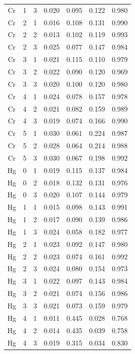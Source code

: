 \documentclass[ms, hidelinks]{uncgdissertationexp3}
\theoremstyle{plain}
\theoremstyle{definition}
\theoremstyle{remark}
\begin{document}
\begin{longtable}{ccccccc}
  Cr & 1 & 3 & 0.020 & 0.095 & 0.122 & 0.980\\
  \rowcolor{gray!6}  Cr & 2 & 1 & 0.016 & 0.108 & 0.131 & 0.990\\
  Cr & 2 & 2 & 0.013 & 0.102 & 0.119 & 0.993\\
  \rowcolor{gray!6}  Cr & 2 & 3 & 0.025 & 0.077 & 0.147 & 0.984\\
  Cr & 3 & 1 & 0.021 & 0.115 & 0.110 & 0.979\\
  \rowcolor{gray!6}  Cr & 3 & 2 & 0.022 & 0.090 & 0.120 & 0.969\\
  Cr & 3 & 3 & 0.020 & 0.100 & 0.120 & 0.980\\
  \rowcolor{gray!6}  Cr & 4 & 1 & 0.024 & 0.078 & 0.157 & 0.978\\
  Cr & 4 & 2 & 0.021 & 0.082 & 0.159 & 0.989\\
  \rowcolor{gray!6}  Cr & 4 & 3 & 0.019 & 0.074 & 0.166 & 0.990\\
  Cr & 5 & 1 & 0.030 & 0.061 & 0.224 & 0.987\\
  \rowcolor{gray!6}  Cr & 5 & 2 & 0.028 & 0.064 & 0.214 & 0.988\\
  Cr & 5 & 3 & 0.030 & 0.067 & 0.198 & 0.992\\
  \rowcolor{gray!6}  Hg & 0 & 1 & 0.019 & 0.115 & 0.137 & 0.984\\
  Hg & 0 & 2 & 0.018 & 0.132 & 0.131 & 0.976\\
  \rowcolor{gray!6}  Hg & 0 & 3 & 0.020 & 0.107 & 0.144 & 0.979\\
  Hg & 1 & 1 & 0.015 & 0.098 & 0.143 & 0.991\\
  \rowcolor{gray!6}  Hg & 1 & 2 & 0.017 & 0.090 & 0.139 & 0.986\\
  Hg & 1 & 3 & 0.024 & 0.058 & 0.182 & 0.977\\
  \rowcolor{gray!6}  Hg & 2 & 1 & 0.023 & 0.092 & 0.147 & 0.980\\
  Hg & 2 & 2 & 0.023 & 0.074 & 0.161 & 0.992\\
  \rowcolor{gray!6}  Hg & 2 & 3 & 0.024 & 0.080 & 0.154 & 0.973\\
  Hg & 3 & 1 & 0.022 & 0.097 & 0.143 & 0.984\\
  \rowcolor{gray!6}  Hg & 3 & 2 & 0.021 & 0.074 & 0.156 & 0.986\\
  Hg & 3 & 3 & 0.021 & 0.073 & 0.159 & 0.979\\
  \rowcolor{gray!6}  Hg & 4 & 1 & 0.011 & 0.445 & 0.028 & 0.768\\
  Hg & 4 & 2 & 0.014 & 0.435 & 0.039 & 0.758\\
  \rowcolor{gray!6}  Hg & 4 & 3 & 0.019 & 0.315 & 0.034 & 0.830\\

\end{longtable}
\end{document}
